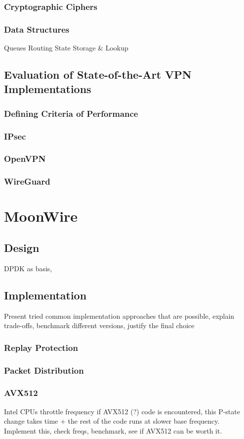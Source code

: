 \documentclass[IN,11pt,twoside,openright,master,english]{tumthesis}
\begin{document}
	\subsection{Cryptographic Ciphers}
	\subsection{Data Structures}
		Queues
		Routing
		State Storage \& Lookup
\section{Evaluation of State-of-the-Art VPN Implementations}
	\subsection{Defining Criteria of Performance}
	\subsection{IPsec}
	\subsection{OpenVPN}
	\subsection{WireGuard}

\chapter{MoonWire}
\label{chap:moonwire}
\section{Design}
	DPDK as basis, 
\section{Implementation}
	Present tried common implementation approaches that are possible, explain trade-offs, benchmark different versions, justify the final choice
	\subsection{Replay Protection}
	\subsection{Packet Distribution}
	\subsection{AVX512}
		Intel CPUs throttle frequency if AVX512 (?) code is encountered, this P-state change takes time + the rest of the code runs at slower base frequency.
		Implement this, check freqs, benchmark, see if AVX512 can be worth it.
\end{document}
